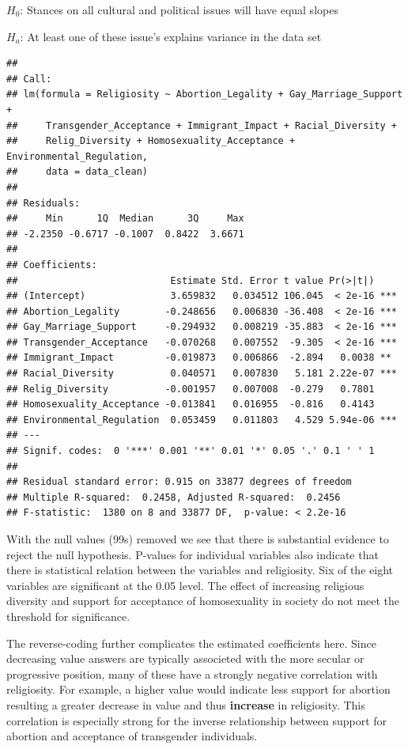 \documentclass[
]{article}
\begin{document}
\(H_0\): Stances on all cultural and political issues will have equal
slopes

\(H_a\): At least one of these issue's explains variance in the data set

\begin{verbatim}
## 
## Call:
## lm(formula = Religiosity ~ Abortion_Legality + Gay_Marriage_Support + 
##     Transgender_Acceptance + Immigrant_Impact + Racial_Diversity + 
##     Relig_Diversity + Homosexuality_Acceptance + Environmental_Regulation, 
##     data = data_clean)
## 
## Residuals:
##     Min      1Q  Median      3Q     Max 
## -2.2350 -0.6717 -0.1007  0.8422  3.6671 
## 
## Coefficients:
##                           Estimate Std. Error t value Pr(>|t|)    
## (Intercept)               3.659832   0.034512 106.045  < 2e-16 ***
## Abortion_Legality        -0.248656   0.006830 -36.408  < 2e-16 ***
## Gay_Marriage_Support     -0.294932   0.008219 -35.883  < 2e-16 ***
## Transgender_Acceptance   -0.070268   0.007552  -9.305  < 2e-16 ***
## Immigrant_Impact         -0.019873   0.006866  -2.894   0.0038 ** 
## Racial_Diversity          0.040571   0.007830   5.181 2.22e-07 ***
## Relig_Diversity          -0.001957   0.007008  -0.279   0.7801    
## Homosexuality_Acceptance -0.013841   0.016955  -0.816   0.4143    
## Environmental_Regulation  0.053459   0.011803   4.529 5.94e-06 ***
## ---
## Signif. codes:  0 '***' 0.001 '**' 0.01 '*' 0.05 '.' 0.1 ' ' 1
## 
## Residual standard error: 0.915 on 33877 degrees of freedom
## Multiple R-squared:  0.2458, Adjusted R-squared:  0.2456 
## F-statistic:  1380 on 8 and 33877 DF,  p-value: < 2.2e-16
\end{verbatim}

With the null values (99s) removed we see that there is substantial
evidence to reject the null hypothesis. P-values for individual
variables also indicate that there is statistical relation between the
variables and religiosity. Six of the eight variables are significant at
the 0.05 level. The effect of increasing religious diversity and support
for acceptance of homosexuality in society do not meet the threshold for
significance.

The reverse-coding further complicates the estimated coefficients here.
Since decreasing value answers are typically associeted with the more
secular or progressive position, many of these have a strongly negative
correlation with religiosity. For example, a higher value would indicate
less support for abortion resulting a greater decrease in value and thus
\textbf{increase} in religiosity. This correlation is especially strong
for the inverse relationship between support for abortion and acceptance
of transgender individuals.
\end{document}
